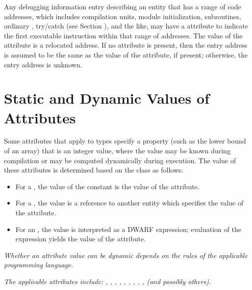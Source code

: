 Any debugging information entry describing an entity that has
a range of code addresses, which includes compilation units,
module initialization, subroutines, 
ordinary , 
try/catch  (see Section ),
and the like, 
may have a  attribute to
indicate the first executable instruction within that range
of addresses. The value of the  attribute is a
relocated address. If no  attribute is present,
then the entry address is assumed to be the same as the
value of the  attribute, if present; otherwise,
the entry address is unknown.

\section{Static and Dynamic Values of Attributes}
\label{chap:staticanddynamicvaluesofattributes}

Some attributes that apply to types specify a property (such
as the lower bound of an array) that is an integer value,
where the value may be known during compilation or may be
computed dynamically during execution.  The value of these
attributes is determined based on the class as follows:

\begin{itemize}
\item For a , the value of the constant is the value of
the attribute.

\item For a , the
value is a reference to another
entity which specifies the value of the attribute.

\item For an , the value is interpreted as a 
DWARF expression; 
evaluation of the expression yields the value of
the attribute.
\end{itemize}

\textit{%
Whether an attribute value can be dynamic depends on the
rules of the applicable programming language.
}

\textit{The applicable attributes include: 
,
, 
, 
,
, 
, 
,
, 
, 
 (and
possibly others).}


